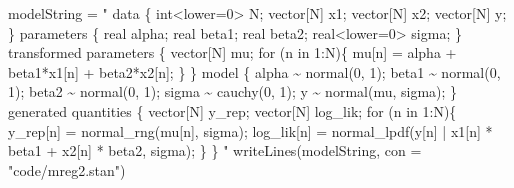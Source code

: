 \documentclass[
  10pt,
  italian,
  a4paper,
  extrafontsizes,onecolumn,openright
  ]{memoir}
\newenvironment{Shaded}{\begin{snugshade}}{\end{snugshade}}
\newcommand{\AttributeTok}[1]{\textcolor[rgb]{0.77,0.63,0.00}{#1}}
\newcommand{\DecValTok}[1]{\textcolor[rgb]{0.00,0.00,0.81}{#1}}
\newcommand{\FunctionTok}[1]{\textcolor[rgb]{0.00,0.00,0.00}{#1}}
\newcommand{\NormalTok}[1]{#1}
\newcommand{\OtherTok}[1]{\textcolor[rgb]{0.56,0.35,0.01}{#1}}
\newcommand{\SpecialCharTok}[1]{\textcolor[rgb]{0.00,0.00,0.00}{#1}}
\newcommand{\StringTok}[1]{\textcolor[rgb]{0.31,0.60,0.02}{#1}}
\theoremstyle{definition}
\theoremstyle{definition}
\theoremstyle{definition}
\theoremstyle{definition}
\theoremstyle{remark}
\begin{document}
\begin{Shaded}
\begin{Highlighting}[]
\NormalTok{modelString }\OtherTok{=} \StringTok{"}
\StringTok{data \{}
\StringTok{  int\textless{}lower=0\textgreater{} N;}
\StringTok{  vector[N] x1;}
\StringTok{  vector[N] x2;}
\StringTok{  vector[N] y;}
\StringTok{\}}
\StringTok{parameters \{}
\StringTok{  real alpha;}
\StringTok{  real beta1;}
\StringTok{  real beta2;}
\StringTok{  real\textless{}lower=0\textgreater{} sigma;}
\StringTok{\}}
\StringTok{transformed parameters \{}
\StringTok{  vector[N] mu;}
\StringTok{  for (n in 1:N)\{}
\StringTok{    mu[n] = alpha + beta1*x1[n] + beta2*x2[n];}
\StringTok{  \}}
\StringTok{\}}
\StringTok{model \{}
\StringTok{  alpha \textasciitilde{} normal(0, 1);}
\StringTok{  beta1 \textasciitilde{} normal(0, 1);}
\StringTok{  beta2 \textasciitilde{} normal(0, 1);}
\StringTok{  sigma \textasciitilde{} cauchy(0, 1);}
\StringTok{  y \textasciitilde{} normal(mu, sigma);}
\StringTok{\}}
\StringTok{generated quantities \{}
\StringTok{  vector[N] y\_rep;}
\StringTok{  vector[N] log\_lik;}
\StringTok{  for (n in 1:N)\{}
\StringTok{    y\_rep[n] = normal\_rng(mu[n], sigma);}
\StringTok{    log\_lik[n] = normal\_lpdf(y[n] | x1[n] * beta1 + x2[n] * beta2, sigma);}
\StringTok{  \}}
\StringTok{\}}
\StringTok{"}
\FunctionTok{writeLines}\NormalTok{(modelString, }\AttributeTok{con =} \StringTok{"code/mreg2.stan"}\NormalTok{)}
\end{Highlighting}
\end{Shaded}

\begin{Shaded}
\end{Shaded}

\begin{Shaded}
\end{Shaded}
\end{document}

